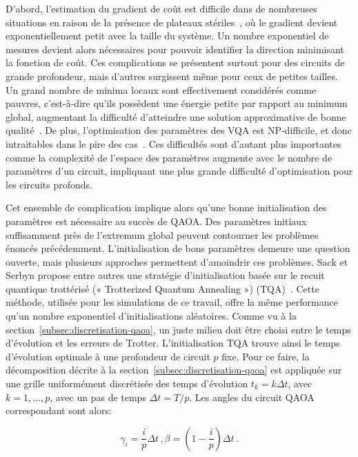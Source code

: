 D'abord, l'estimation du gradient de coût est difficile dans de nombreuses situations en raison de la présence de plateaux stériles~\cite{mccleanBarrenPlateausQuantum2018, laroccaReviewBarrenPlateaus2024}, où le gradient devient exponentiellement petit avec la taille du système. Un nombre exponentiel de mesures devient alors nécessaires pour pouvoir identifier la direction minimisant la fonction de coût. Ces complications se présentent surtout pour des circuits de grande profondeur, mais d'autres surgissent même pour ceux de petites tailles. Un grand nombre de minima locaux sont effectivement considérés comme pauvres, c'est-à-dire qu'ils possèdent une énergie petite par rapport au minimum global, augmentant la difficulté d'atteindre une solution approximative de bonne qualité~\cite{anschuetzQuantumVariationalAlgorithms2022}. De plus, l'optimisation des paramètres des VQA est \textsf{NP}-difficile, et donc intraitables dans le pire des cas~\cite{bittelTrainingVariationalQuantum2021}. Ces difficultés sont d'autant plus importantes comme la complexité de l'espace des paramètres augmente avec le nombre de paramètres d'un circuit, impliquant une plus grande difficulté d'optimisation pour les circuits profonds. 

Cet ensemble de complication implique alors qu'une bonne initialisation des paramètres est nécessaire au succès de QAOA. Des paramètres initiaux suffisamment près de l'extremum global peuvent contourner les problèmes énoncés précédemment. L'initialisation de bons paramètres demeure une question ouverte, mais plusieurs approches permettent d'amoindrir ces problèmes. Sack et Serbyn propose entre autres une stratégie d'initialisation basée sur le recuit quantique trottérisé (« Trotterized Quantum Annealing ») (TQA)~\cite{sackQuantumAnnealingInitialization2021}. Cette méthode, utilisée pour les simulations de ce travail, offre la même performance qu'un nombre exponentiel d'initialisations aléatoires. Comme vu à la section~\ref{subsec:discretisation-qaoa}, un juste milieu doit être choisi entre le temps d'évolution et les erreurs de Trotter. L'initialisation TQA trouve ainsi le temps d'évolution optimale à une profondeur de circuit $p$ fixe. Pour ce faire, la décomposition décrite à la section~\ref{subsec:discretisation-qaoa} est appliquée sur une grille uniformément discrétisée des temps d'évolution $t_{k} = k \Delta t$, avec $k = 1,\dots, p$, avec un pas de temps $\Delta t = T / p$. Les angles du circuit QAOA correspondant sont alors:

\begin{equation}
    \gamma_{i} = \frac{i}{p} \Delta t \,, \beta = (1 - \frac{i}{p}) \Delta t \,.
\end{equation}

